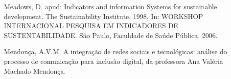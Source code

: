 \documentclass[
12pt,		%
openright,	%
twoside,  %
a4paper,			%
chapter=TITLE,		%
english,			%
french,				%
spanish,			%
brazil				%
]{USPSC-classe/USPSC}
\begin{document}
\begin{flushleft}
\begin{flushleft}
\begin{flushleft}
\begin{flushleft}
\begin{flushleft}
\begin{flushleft}
\begin{flushleft}
\begin{flushleft}
\begin{flushleft}
[MEADOWS, 2006] Meadows, D. apud: Indicators and information Systems for sustainable development. The Sustainability Institute, 1998, In: WORKSHOP INTERNACIONAL PESQUISA EM INDICADORES DE SUSTENTABILIDADE. S\~ao Paulo, Faculdade de Sa\'ude P\'ublica, 2006.
\end{flushleft}


\end{flushleft}


\end{flushleft}


\end{flushleft}


\end{flushleft}


\end{flushleft}


\end{flushleft}


\end{flushleft}


\end{flushleft}


\begin{flushleft}
\begin{flushleft}
\begin{flushleft}
\begin{flushleft}
\begin{flushleft}
\begin{flushleft}
\begin{flushleft}
\begin{flushleft}
\begin{flushleft}
[MENDON\c{C}A, 2015] Mendon\c{c}a, A.V.M. A integra\c{c}\~ao de redes sociais e tecnol\'ogicas: an\'alise do processo de comunica\c{c}\~ao para inclus\~ao digital, da professora Ana Val\'eria  Machado  Mendon\c{c}a.
\end{flushleft}


\end{flushleft}


\end{flushleft}


\end{flushleft}


\end{flushleft}


\end{flushleft}


\end{flushleft}


\end{flushleft}


\end{flushleft}
\end{document}
